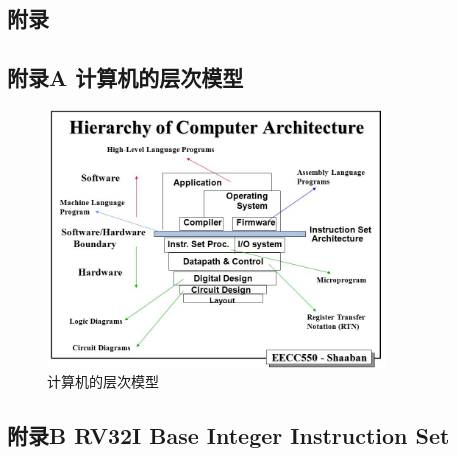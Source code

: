 \begin{ujnappendix}
\section[附录]{附\qquad 录}
    \subsection*{附录A 计算机的层次模型}
        \begin{figure}[htbp]
            \centering
            \includegraphics[width=0.8\textwidth]{figures/computer-arch.png}
            \caption{计算机的层次模型}
            \label{fig:computer-arch}
        \end{figure}
    \subsection*{附录B RV32I Base Integer Instruction Set}
\end{ujnappendix}
